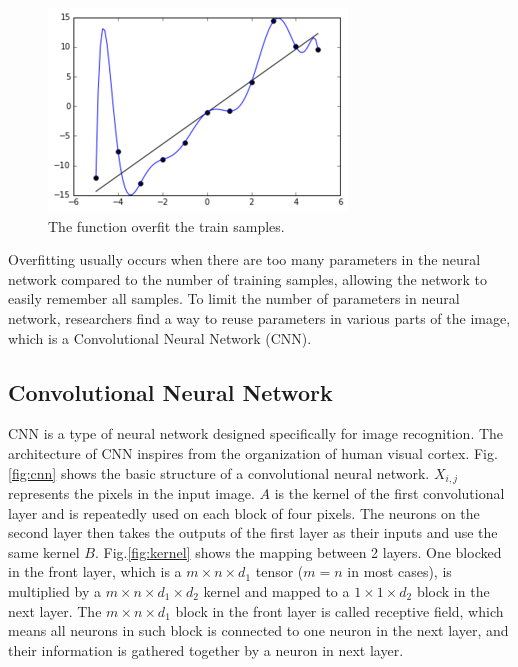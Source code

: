 \begin{figure}[H]
  \centering
  \includegraphics[width=.7\linewidth]{figures/overfit.png}
  \caption{The function overfit the train samples.}
  \label{fig:overfit}
\end{figure}

Overfitting usually occurs when there are too many parameters in the neural network compared to the number of training samples, allowing the network to easily remember all samples. To limit the number of parameters in neural network, researchers find a way to reuse parameters in various parts of the image, which is a Convolutional Neural Network (CNN).

\subsection{Convolutional Neural Network}

CNN is a type of neural network designed specifically for image recognition. The architecture of CNN inspires from the organization of human visual cortex. Fig.\ref{fig:cnn} shows the basic structure of a convolutional neural network. $X_{i,j}$ represents the pixels in the input image. $A$ is the kernel of the first convolutional layer and is repeatedly used on each block of four pixels. The neurons on the second layer then takes the outputs of the first layer as their inputs and use the same kernel $B$. Fig.\ref{fig:kernel} shows the mapping between 2 layers. One blocked in the front layer, which is a  $m \times n \times d_1$ tensor ($m = n$ in most cases), is multiplied by a $m \times n \times d_1 \times d_2$ kernel and mapped to a $1 \times 1 \times d_2$ block in the next layer. The $m \times n \times d_1$ block in the front layer is called receptive field, which means all neurons in such block is connected to one neuron in the next layer, and their information is gathered together by a neuron in next layer.

